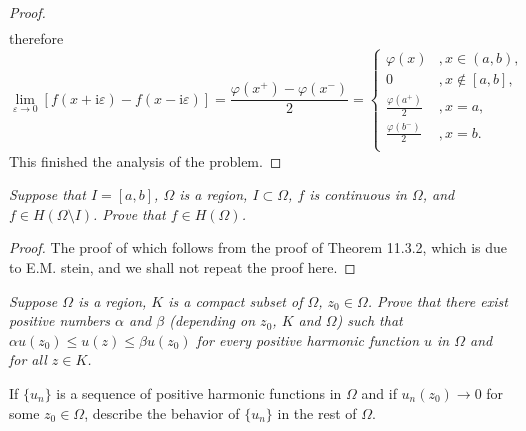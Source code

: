 \begin{proof}
$$\begin{aligned}
\end{aligned}
$$
therefore 
$$
\lim_{\varepsilon \rightarrow 0} \left[ f\left( x+\mathrm{i}\varepsilon \right) -f\left( x-\mathrm{i}\varepsilon \right) \right] =\frac{\varphi \left( x^+ \right) -\varphi \left( x^- \right)}{2}=\left\{ \begin{aligned}
	\varphi \left( x \right) &,x\in \left( a,b \right) ,\\
	0&,x\notin \left[ a,b \right] ,\\
	\frac{\varphi \left( a^+ \right)}{2}&,x=a,\\
	\frac{\varphi \left( b^- \right)}{2}&,x=b.\\
\end{aligned} \right. 
$$
This finished the analysis of the problem.
\end{proof}
\begin{problem}\em
Suppose that $I=[a,b]$, $\Omega$ is a region, $I\subset\Omega$, $f$ is continuous in $\Omega$, and $f\in H(\Omega\setminus I)$. Prove that $f\in H(\Omega)$.
\end{problem}
\begin{proof}
The proof of which follows from the proof of Theorem 11.3.2, which is due to E.M. stein, and we shall not repeat the proof here.
\end{proof}
\begin{problem}\em
Suppose $\Omega$ is a region, $K$ is a compact subset of $\Omega$, $z_0\in\Omega$. Prove that there exist positive numbers $\alpha$ and $\beta$ (depending on $z_0$, $K$ and $\Omega$) such that $\alpha u(z_0)\le u(z)\le \beta u(z_0)$ for every positive harmonic function $u$ in $\Omega$ and for all $z\in K$.\par
If $\{u_n\}$ is a sequence of positive harmonic functions in $\Omega$ and if $u_n(z_0)\to 0$ for some $z_0\in\Omega$, describe the behavior of $\{u_n\}$ in the rest of $\Omega$.
\end{problem}
